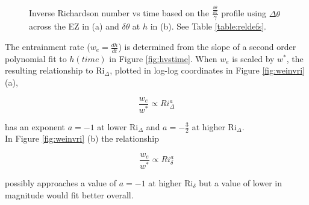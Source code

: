 \begin{figure}[htbp]

\begin{minipage}[b]{0.5\linewidth}
         
        \\
        \end{minipage}             
\quad
\begin{minipage}[b]{0.5\linewidth}
        \\
       
       \end{minipage}
        \caption[Richardson numbers based on $\frac{\frac{\partial \overline{\theta}}{\partial z}}{\gamma}$]{Inverse Richardson number vs time based on the $\frac{\frac{\partial \overline{\theta}}{\partial z}}{\gamma}$
profile using $\Delta \theta$ across the \acs{EZ} in (a) and $\delta \theta$ at $h$ in (b).  See Table \ref{table:reldefs}.}
        \label{fig:invristime}
\end{figure}

\clearpage

The entrainment rate ($w_{e}= \frac{dh}{dt}$) is determined from the slope of a second order polynomial fit to $h(time)$ in Figure \ref{fig:hvstime}.  When $w_{e}$ is scaled by $w^{*}$, the resulting relationship to \acs{Ri}$_{\Delta}$, plotted in log-log coordinates 
in Figure \ref{fig:weinvri} (a), 

\begin{equation}
\frac{w_{e}}{w^{*}} \propto Ri_{\Delta}^{a}
\end{equation}

has an exponent $a = -1$ at lower \acs{Ri}$_{\Delta}$ and $a = -\frac{3}{2}$ at higher \acs{Ri}$_{\Delta}$.\\

In Figure \ref{fig:weinvri} (b) the relationship

\begin{equation}
\frac{w_{e}}{w^{*}} \propto Ri_{\delta}^{a}
\end{equation}

possibly approaches a value of $a = -1$ at higher \acs{Ri}$_{\delta}$ but a value of lower in magnitude would fit better overall. \\    

